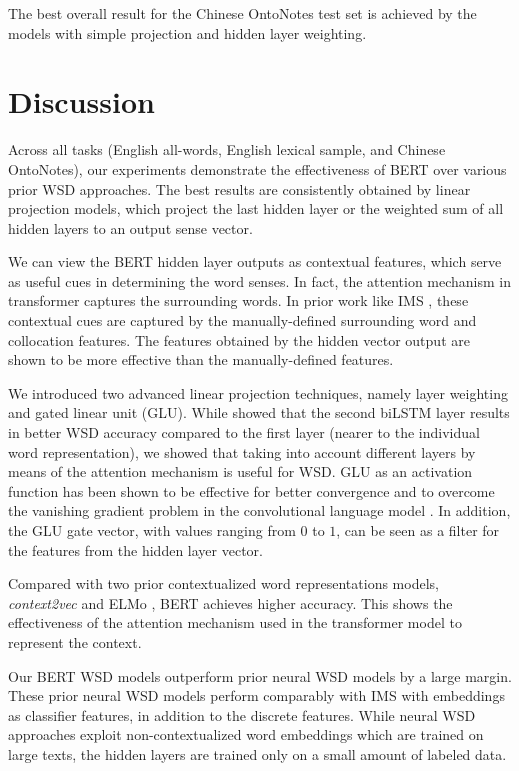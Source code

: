 \documentclass[11pt,a4paper]{article}
\begin{document}
The best overall result for the Chinese OntoNotes test set is achieved by the models with simple projection and hidden layer weighting.

\section{Discussion}
\label{sec:discussion}

Across all tasks (English all-words, English lexical sample, and Chinese OntoNotes), our experiments demonstrate the effectiveness of BERT over various prior WSD approaches. The best results are consistently obtained by linear projection models, which project the last hidden layer or the weighted sum of all hidden layers to an output sense vector.

We can view the BERT hidden layer outputs as contextual features, which serve as useful cues in determining the word senses. In fact, the attention mechanism in transformer captures the surrounding words. In prior work like IMS \cite{zhong_it_2010}, these contextual cues are captured by the manually-defined surrounding word and collocation features. The features obtained by the hidden vector output are shown to be more effective than the manually-defined features. 

We introduced two advanced linear projection techniques, namely layer weighting and gated linear unit (GLU). While \citet{peters_deep_2018} showed that the second biLSTM layer results in better WSD accuracy compared to the first layer (nearer to the individual word representation), we showed that taking into account different layers by means of the attention mechanism is useful for WSD. GLU as an activation function has been shown to be effective for better convergence and to overcome the vanishing gradient problem in the convolutional language model \cite{dauphin_language_2017}. In addition, the GLU gate vector, with values ranging from $0$ to $1$, can be seen as a filter for the features from the hidden layer vector. 

Compared with two prior contextualized word representations models, \textit{context2vec} \cite{melamud_context2vec:_2016} and ELMo \cite{peters_deep_2018}, BERT achieves higher accuracy. This shows the effectiveness of the attention mechanism used in the transformer model to represent the context.

Our BERT WSD models outperform prior neural WSD models by a large margin. These prior neural WSD models perform comparably with IMS with embeddings as classifier features, in addition to the discrete features. While neural WSD approaches \cite{kageback_word_2016,raganato_neural_2017,luo_incorporating_2018} exploit non-contextualized word embeddings which are trained on large texts, the hidden layers are trained only on a small amount of labeled data. 
\end{document}
